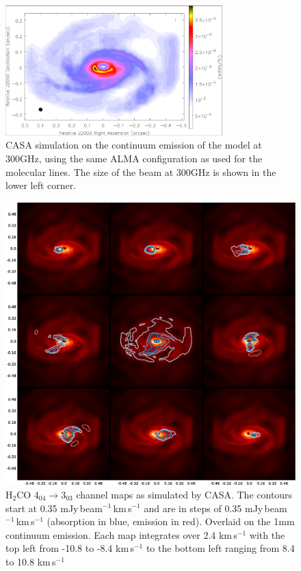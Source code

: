 \documentclass[useAMS,usenatbib]{mn2e}
\begin{document}
\begin{figure}
 \includegraphics[width=84mm]{Figures/sim/casa_cont_300GHz_invert.eps}

 \caption{CASA simulation on the continuum emission of the model at 300GHz, using the same ALMA configuration as used for the molecular lines. The size of the beam at 300GHz is shown in the lower left corner.}
 \label{continuum}
\end{figure}


\begin{figure}
 \includegraphics[width=168mm]{Figures/sim/channel_map-1.eps} 
 \caption{H$_2$CO 4$_{04}\rightarrow$3$_{03}$ channel maps as simulated by CASA. The contours start at 0.35 mJy$\,$beam$^{-1}\,$km$\,$s$^{-1}$  and are in steps of 0.35 mJy$\,$beam$^{-1}\,$km$\,$s$^{-1}$ (absorption in blue, emission in red). Overlaid on the 1mm continuum emission. Each map integrates over 2.4 km$\,$s$^{-1}$ with the top left from -10.8 to -8.4 km$\,$s$^{-1}$ to the bottom left ranging from 8.4 to 10.8 km$\,$s$^{-1}$}
 \label{h2co_chanmap}
\end{figure}
\end{document}
